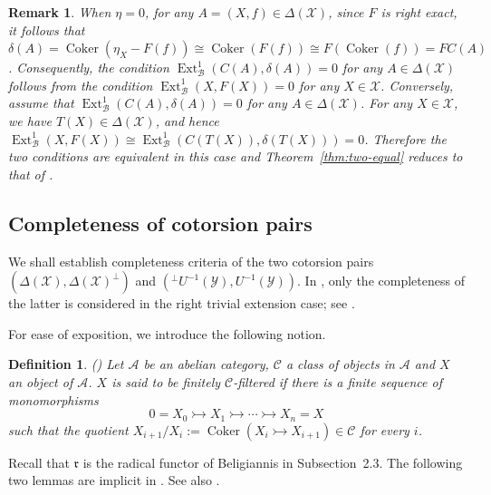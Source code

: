\documentclass[11pt,reqno]{amsart}
\numberwithin{equation}{section}
\newtheorem{remark}[theorem]{Remark}
\newtheorem{definition}[theorem]{Definition}
\newcommand{\cA}{\mathcal A}
\newcommand{\cB}{\mathcal B}
\newcommand{\cX}{\mathcal X}
\newcommand{\cY}{\mathcal Y}
\newcommand{\cC}{\mathcal C}
\newcommand{\Ext}{\operatorname{Ext}}
\newcommand{\Coker}{\operatorname{Coker}}
\newcommand{\radf}{\mathfrak r}
\begin{document}
\begin{remark}\label{rem:equal-reduce}
{\rm
When $\eta=0$, for any $A=(X,f)\in \Delta(\cX)$, since $F$ is right exact, it follows that $\delta(A)=\Coker(\eta_{X}-F(f))\cong \Coker(F(f))\cong F(\Coker(f))=FC(A)$. Consequently,
the condition $\Ext^1_{\cB}(C(A),\delta(A))=0$ for any $A\in \Delta(\cX)$ follows from the condition $\Ext^1_{\cB}(X,F(X))=0$ for any $X\in \cX$. Conversely,
assume that $\Ext^1_{\cB}(C(A),\delta(A))=0$ for any $A\in \Delta(\cX)$. For any $X\in \cX$, we have $T(X)\in \Delta(\cX)$, and hence
$\Ext^1_{\cB}(X,F(X))\cong \Ext^1_{\cB}(C(T(X)),\delta(T(X)))=0$. Therefore the two conditions are equivalent in this case and Theorem~\ref{thm:two-equal} reduces to that of \cite[Theorem~3.11]{Hu}.
}
\end{remark}



\subsection{Completeness of cotorsion pairs}

We shall establish completeness criteria of the two cotorsion pairs $(\Delta(\cX),\Delta(\cX)^\perp)$ and $({}^\perp U^{-1}(\cY),U^{-1}(\cY))$. In \cite{Hu}, only the completeness
of the latter is considered in the right trivial extension case; see \cite[Theorem~3.13]{Hu}.


For ease of exposition, we introduce the following notion.

\begin{definition}
{\rm (\cite[Definition 3.1.1]{GobelTrlifaj})}
Let $\cA$ be an abelian category, $\cC$ a class of objects in $\cA$ and $X$ an object of $\cA$. $X$ is said to be finitely $\cC$-filtered if
there is a finite sequence of monomorphisms
\[
0=X_0\rightarrowtail X_1\rightarrowtail \cdots \rightarrowtail X_n=X
\]
such that the quotient $X_{i+1}/X_i:=\Coker(X_i\rightarrowtail X_{i+1})\in \cC$ for every $i$.
\end{definition}

Recall that $\radf$ is the radical functor of Beligiannis in Subsection~2.3. The following two lemmas are implicit in \cite{Beligiannis}. See also \cite{LG}.
\end{document}
